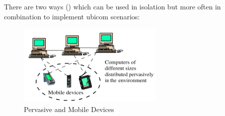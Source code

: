 \noindent There are two ways () which can be used in isolation but more often in combination to implement ubicom scenarios:

\begin{figure}[ht]
	\begin{center}
		\includegraphics[width=7cm,height=!]{ch01/pm}
	\end{center}
	\caption{Pervasive and Mobile Devices}
	\label{fig:ch01pm}
\end{figure}

